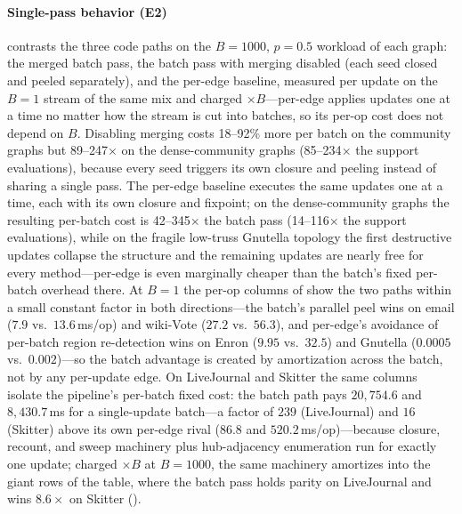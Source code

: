\paragraph{Single-pass behavior (E2)}
\label{par:singlepass}
 contrasts the three code paths on the $B{=}1000$, $p{=}0.5$ workload of each graph: the merged batch pass, the batch pass with merging disabled (each seed closed and peeled separately), and the per-edge baseline, measured per update on the $B{=}1$ stream of the same mix and charged $\times B$---per-edge applies updates one at a time no matter how the stream is cut into batches, so its per-op cost does not depend on $B$.
Disabling merging costs 18--92\% more per batch on the community graphs but 89--247$\times$ on the dense-community graphs (85--234$\times$ the support evaluations), because every seed triggers its own closure and peeling instead of sharing a single pass.
The per-edge baseline executes the same updates one at a time, each with its own closure and fixpoint; on the dense-community graphs the resulting per-batch cost is 42--345$\times$ the batch pass (14--116$\times$ the support evaluations), while on the fragile low-truss Gnutella topology the first destructive updates collapse the structure and the remaining updates are nearly free for every method---per-edge is even marginally cheaper than the batch's fixed per-batch overhead there.
At $B{=}1$ the per-op columns of  show the two paths within a small constant factor in both directions---the batch's parallel peel wins on email ($7.9$ vs.\ $13.6$\,ms/op) and wiki-Vote ($27.2$ vs.\ $56.3$), and per-edge's avoidance of per-batch region re-detection wins on Enron ($9.95$ vs.\ $32.5$) and Gnutella ($0.0005$ vs.\ $0.002$)---so the batch advantage is created by amortization across the batch, not by any per-update edge.
On LiveJournal and Skitter the same columns isolate the pipeline's per-batch fixed cost: the batch path pays $20{,}754.6$ and $8{,}430.7$\,ms for a single-update batch---a factor of $239$ (LiveJournal) and $16$ (Skitter) above its own per-edge rival ($86.8$ and $520.2$\,ms/op)---because closure, recount, and sweep machinery plus hub-adjacency enumeration run for exactly one update; charged $\times B$ at $B{=}1000$, the same machinery amortizes into the giant rows of the table, where the batch pass holds parity on LiveJournal and wins $8.6\times$ on Skitter ().

\begin{table}[tb]
\caption{Batch, no-merge, and per-edge costs on the $B{=}1000$, $p{=}0.5$ workload (ms/batch; $T{=}32$; per-edge is charged $\times B$ from its $B$-invariant per-op cost, the two $B{=}1$ columns report per-op costs themselves---$50$K-op streams with five runs on the six smaller graphs, a $200$-op single-run batch probe and a $200$K-op single-run per-edge stream on LiveJournal and Skitter---and evals (N/B)/(P/B) are support-evaluation ratios of no-merge and per-edge over the batch pass; means of five runs, three on YouTube, LiveJournal, and Skitter; dashes mark configurations not run, and the corresponding claims are scoped to the measured graphs).}
\label{tab:singlepass}

\end{table}

